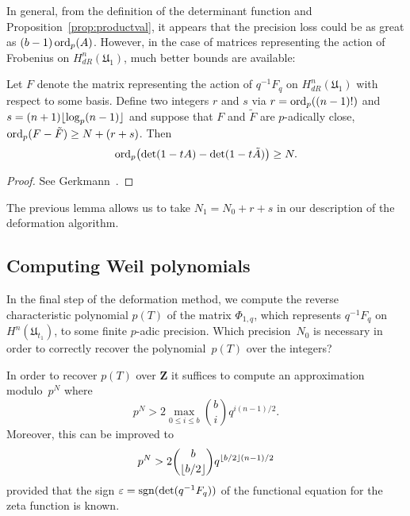 In general, from the definition of the determinant function and 
Proposition~\ref{prop:productval}, it appears that the precision 
loss could be as great as $(b-1) \operatorname{ord}_p(A)$.  However, in the case 
of matrices representing the action of Frobenius 
on $H_{dR}^n(\mathfrak{U}_1)$, much better bounds are available:

\begin{lem} \label{lem:charpoly}
Let $F$ denote the matrix representing the action of $q^{-1} F_q$ 
on $H_{dR}^{n}(\mathfrak{U}_1)$ with respect to some basis.  Define 
two integers $r$ and $s$ via \mbox{$r = \operatorname{ord}_p((n-1)!)$} and 
\mbox{$s = (n + 1) \lfloor\log_p (n-1)\rfloor$} and suppose that 
$F$ and $\tilde{F}$ are $p$-adically close, 
$\operatorname{ord}_p(F-\tilde{F}) \geq N + (r + s)$.  Then 
\begin{equation*}
\operatorname{ord}_p \bigl( \det(1 - t A) - \det(1 - t \tilde{A}) \bigr) \geq N.
\end{equation*}
\end{lem}

\begin{proof} 
See Gerkmann~\citep[Lemma~3.3, Lemma~3.4]{Gerkmann2007}.
\end{proof}

The previous lemma allows us to take 
$N_1 = N_0 + r + s$ in our description of the deformation 
algorithm.

\subsection{Computing Weil polynomials}

In the final step of the deformation method, we compute the 
reverse characteristic polynomial $p(T)$ of the matrix $\Phi_{1,q}$, 
which represents $q^{-1} F_q$ on $H^n(\mathfrak{U}_{t_1})$, to some finite 
$p$-adic precision.  Which precision~$N_0$ is necessary in order to 
correctly recover the polynomial~$p(T)$ over the integers?

\begin{thm} \label{thm:N0}
In order to recover $p(T)$ over $\mathbf{Z}$ it suffices to compute 
an approximation modulo~$p^N$ where 
\begin{equation*}
p^N > 2 \max_{0 \leq i \leq b} \binom{b}{i} q^{i (n-1) / 2}.
\end{equation*}
Moreover, this can be improved to 
\begin{equation*}
p^N > 2 \binom{b}{\left\lfloor b/2\right\rfloor} q^{\left\lfloor b/2\right\rfloor (n-1) / 2}
\end{equation*}
provided that the sign $\varepsilon = \operatorname{sgn}(\det(q^{-1} F_q))$ of the 
functional equation for the zeta function is known.
\end{thm}

